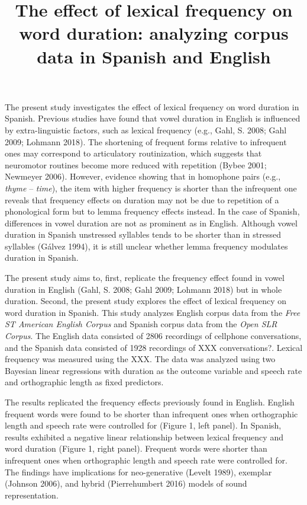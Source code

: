 \documentclass[
  12pt,
]{article}
\title{The effect of lexical frequency on word duration: analyzing
corpus data in Spanish and English}
\author{}
\date{\vspace{-2.5em}}
\begin{document}
\maketitle

The present study investigates the effect of lexical frequency on word
duration in Spanish. Previous studies have found that vowel duration in
English is influenced by extra-linguistic factors, such as lexical
frequency (e.g., Gahl, S. 2008; Gahl 2009; Lohmann 2018). The shortening
of frequent forms relative to infrequent ones may correspond to
articulatory routinization, which suggests that neuromotor routines
become more reduced with repetition (Bybee 2001; Newmeyer 2006).
However, evidence showing that in homophone pairs (e.g., \emph{thyme} --
\emph{time}), the item with higher frequency is shorter than the
infrequent one reveals that frequency effects on duration may not be due
to repetition of a phonological form but to lemma frequency effects
instead. In the case of Spanish, differences in vowel duration are not
as prominent as in English. Although vowel duration in Spanish
unstressed syllables tends to be shorter than in stressed syllables
(Gálvez 1994), it is still unclear whether lemma frequency modulates
duration in Spanish.

The present study aims to, first, replicate the frequency effect found
in vowel duration in English (Gahl, S. 2008; Gahl 2009; Lohmann 2018)
but in whole duration. Second, the present study explores the effect of
lexical frequency on word duration in Spanish. This study analyzes
English corpus data from the \emph{Free ST American English Corpus} and
Spanish corpus data from the \emph{Open SLR Corpus}. The English data
consisted of 2806 recordings of cellphone conversations, and the Spanish
data consisted of 1928 recordings of XXX conversations?. Lexical
frequency was measured using the XXX. The data was analyzed using two
Bayesian linear regressions with duration as the outcome variable and
speech rate and orthographic length as fixed predictors.

The results replicated the frequency effects previously found in
English. English frequent words were found to be shorter than infrequent
ones when orthographic length and speech rate were controlled for
(Figure 1, left panel). In Spanish, results exhibited a negative linear
relationship between lexical frequency and word duration (Figure 1,
right panel). Frequent words were shorter than infrequent ones when
orthographic length and speech rate were controlled for. The findings
have implications for neo-generative (Levelt 1989), exemplar (Johnson
2006), and hybrid (Pierrehumbert 2016) models of sound representation.
\end{document}
